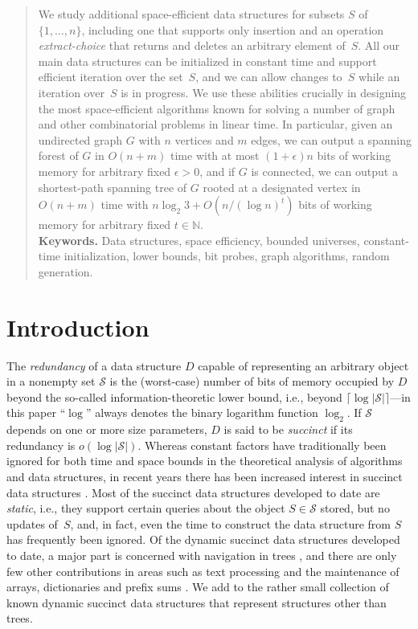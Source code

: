 \documentclass[envcountsame,envcountsect,undated,nolinenumbers]{lnthi}
\def\Tvn#1{\hbox{\textit{#1\/}}}
\def\Tceil#1{\lceil #1\rceil}
\def\TbbbN{\mathbb{N}}
\begin{document}
\begin{abstract}
We study additional space-efficient
data structures for subsets $S$ of $\{1,\ldots,n\}$, including
one that supports only insertion and an
operation \Tvn{extract-choice} that returns
and deletes an arbitrary element of~$S$.
All our main data structures can be
initialized in constant time and
support efficient iteration over the set~$S$, and we can allow
changes to~$S$ while an iteration over~$S$ is in progress.
We use these abilities crucially in designing the most
space-efficient algorithms known for solving
a number of graph and other combinatorial problems
in linear time.
In particular, given an undirected graph $G$ with
$n$ vertices and $m$ edges, we can output a spanning
forest of $G$ in $O(n+m)$ time with at most
$(1+\epsilon)n$ bits of
working memory for arbitrary fixed $\epsilon>0$,
and if $G$ is connected,
we can output a shortest-path spanning
tree of $G$ rooted at a designated vertex
in $O(n+m)$ time
with $n\log_2 3+O({n/{(\log n)^t}})$ bits
of working memory for arbitrary fixed $t\in\TbbbN$.\\

{\bf Keywords.} Data structures, space efficiency, bounded universes,
constant-time initialization, lower bounds, bit probes,
graph algorithms, random generation.
\end{abstract}

\pagestyle{plain}
\thispagestyle{plain}

\section{Introduction}
\label{sec:intro}The \emph{redundancy} of
a data structure $D$ capable of representing an arbitrary
object in a nonempty set $\mathcal{S}$
is the (worst-case) number of bits
of memory occupied by $D$ beyond
the so-called in\-for\-ma\-tion-theoretic lower bound,
i.e., beyond
$\Tceil{\log|\mathcal{S}|}$---in this paper
``$\log$'' always denotes the
binary logarithm function $\log_2$.
If $\mathcal{S}$ depends on one or more size
parameters, $D$ is said to be \emph{succinct}
if its redundancy is $o(\log|\mathcal{S}|)$.
Whereas constant factors have traditionally been ignored
for both time and space bounds in the theoretical
analysis of algorithms and data structures,
in recent years there has been increased
interest in succinct data
structures \cite{BarAHM12,BroM99,Cla96,FerMM09,GeaRRR06,GolGGRR07,Jac89,MunRRR12,Pag01,Pat08,RamRS07}.
Most of the succinct data structures
developed to date are \emph{static}, i.e., they support
certain queries about the object $S\in\mathcal{S}$ stored,
but no updates of~$S$, and, in fact, even the time
to construct the data structure from $S$ has
frequently been ignored.
Of the dynamic succinct data structures developed
to date, a major part is
concerned with navigation in trees
\cite{Arr08,DavR11,FarM11,MunRS01,NavS14,RamR03},
and there are only few other contributions in
areas such as text processing
\cite{HeM10,LeeP09,MakN08,RusNO11}
and the maintenance of arrays, dictionaries and prefix sums
\cite{BroCDMS99,GupHSV07b,RamRR01}.
We add to the rather small collection of
known dynamic succinct data structures
that represent structures other than trees.
\end{document}
